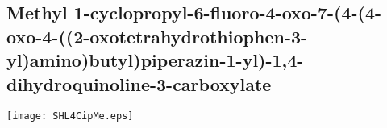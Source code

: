 \subsection{Methyl 1\hyp{}cyclopropyl\hyp{}6\hyp{}fluoro\hyp{}4\hyp{}oxo\hyp{}7\hyp{}(4\hyp{}(4\hyp{}oxo\hyp{}4\hyp{}((2\hyp{}oxotetrahydrothiophen\hyp{}3\hyp{}yl)amino)butyl)pip\allowbreak erazin\hyp{}1\hyp{}yl)\hyp{}1,4\hyp{}dihydroquinoline\hyp{}3\hyp{}carboxylate }


\begin{scheme}[H]
	\begin{center}
		\texttt{[image: SHL4CipMe.eps]}
	\end{center}
\end{scheme}

